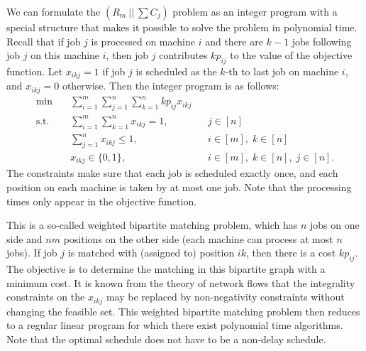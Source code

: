 We can formulate the $(R_m~||~\sum C_j)$ problem as an integer program 
with a special structure that makes it possible to solve the problem in 
polynomial time. Recall that if job $j$ is processed on machine $i$ 
and there are $k-1$ jobs following job $j$ on this machine $i$, then 
job $j$ contributes $kp_{ij}$ to the value of the objective function. 
Let $x_{ikj} = 1$ if job $j$ is scheduled as the $k$-th to last job 
on machine $i$, and $x_{ikj} = 0$ otherwise. Then the integer 
program is as follows: 
\begin{align*}
    \min\quad & \sum_{i=1}^m \sum_{j=1}^n \sum_{k=1}^n kp_{ij} x_{ikj} \\ 
    \text{s.t.}\quad & \sum_{i=1}^m \sum_{k=1}^n x_{ikj} = 1, && j \in [n] \\ 
    & \sum_{j=1}^n x_{ikj} \leq 1, && i \in [m],\; k \in [n] \\ 
    & x_{ikj} \in \{0, 1\}, && i \in [m],\; k \in [n],\; j \in [n]. 
\end{align*}
The constraints make sure that each job is scheduled exactly once, and each
position on each machine is taken by at most one job. Note that the processing
times only appear in the objective function.

This is a so-called weighted bipartite matching problem, which has 
$n$ jobs on one side and $nm$ positions on the other side (each machine can 
process at most $n$ jobs). If job $j$ is matched with (assigned to) 
position $ik$, then there is a cost $kp_{ij}$. The objective is to 
determine the matching in this bipartite graph with a minimum cost. 
It is known from the theory of network flows that the integrality constraints 
on the $x_{ikj}$ may be replaced by non-negativity constraints
without changing the feasible set.  This weighted bipartite matching problem
then reduces to a regular linear program for which there exist polynomial time
algorithms. Note that the optimal schedule does not have to be a non-delay schedule.